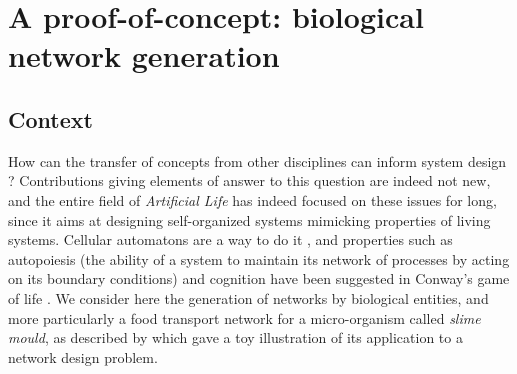 \documentclass[runningheads,a4paper]{llncs2e/llncs}
\begin{document}

%















\section{A proof-of-concept: biological network generation}


\subsection{Context}


How can the transfer of concepts from other disciplines can inform system design ? Contributions giving elements of answer to this question are indeed not new, and the entire field of \emph{Artificial Life} \cite{langton1989artificial} has indeed focused on these issues for long, since it aims at designing self-organized systems mimicking properties of living systems. Cellular automatons are a way to do it \cite{langton1986studying}, and properties such as autopoiesis (the ability of a system to maintain its network of processes by acting on its boundary conditions) and cognition have been suggested in Conway's game of life \cite{beer2004autopoiesis}. We consider here the generation of networks by biological entities, and more particularly a food transport network for a micro-organism called \emph{slime mould}, as described by \cite{tero2010rules} which gave a toy illustration of its application to a network design problem.
\end{document}

